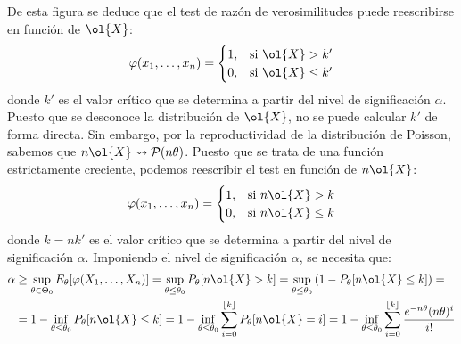 \begin{ejemplo}
\begin{itemize}
\begin{itemize}
            De esta figura se deduce que el test de razón de verosimilitudes puede reescribirse en función de $\ol{X}$:
            \begin{equation*}
                \varphi(x_1, \dots, x_n) =
                \begin{cases}
                    1, & \text{si } \ol{X} > k' \\
                    0, & \text{si } \ol{X} \leq k'
                \end{cases}
            \end{equation*}
            donde $k'$ es el valor crítico que se determina a partir del nivel de significación $\alpha$. Puesto que se desconoce la distribución de $\ol{X}$, no se puede calcular $k'$ de forma directa. Sin embargo, por la reproductividad de la distribución de Poisson, sabemos que $n\ol{X} \rightsquigarrow \cc{P}(n\theta)$. Puesto que se trata de una función estrictamente creciente, podemos reescribir el test en función de $n\ol{X}$:
            \begin{equation*}
                \varphi(x_1, \dots, x_n) =
                \begin{cases}
                    1, & \text{si } n\ol{X} > k \\
                    0, & \text{si } n\ol{X} \leq k
                \end{cases}
            \end{equation*}
            donde $k = n k'$ es el valor crítico que se determina a partir del nivel de significación $\alpha$. Imponiendo el nivel de significación $\alpha$, se necesita que:
            \begin{align*}
                \alpha &\geq \sup_{\theta \in \Theta_0} E_\theta[\varphi(X_1, \dots, X_n)] = \sup_{\theta \leq \theta_0} P_\theta[n\ol{X} > k] = \sup_{\theta \leq \theta_0} \left(1 - P_\theta[n\ol{X} \leq k]\right) =\\&= 1 - \inf_{\theta \leq \theta_0} P_\theta[n\ol{X} \leq k]
                = 1- \inf_{\theta \leq \theta_0} \sum\limits_{i=0}^{\lfloor k \rfloor} P_\theta[n\ol{X} = i] = 1 - \inf_{\theta \leq \theta_0} \sum\limits_{i=0}^{\lfloor k \rfloor} \frac{e^{-n\theta}(n\theta)^i}{i!}
            \end{align*}


\end{itemize}
\end{itemize}
\end{ejemplo}
